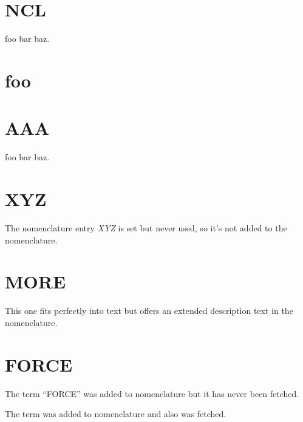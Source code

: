 \documentclass[12pt,oneside]{scrartcl}
\begin{document}
\printnomenclature
\newpage




\section{NCL}



foo bar  baz.

%

\section{foo}



%

\section{AAA}




foo bar  baz.

%

\section{XYZ}

The nomenclature entry \emph{XYZ} is set but never used, so it's not added to the nomenclature.

%

\section{MORE}

This one fits perfectly into text but offers an extended description text in the nomenclature.


%

\section{FORCE}

The term \enquote{FORCE} was added to nomenclature but it has never been fetched.

The term  was added to nomenclature and also was fetched.
\end{document}
